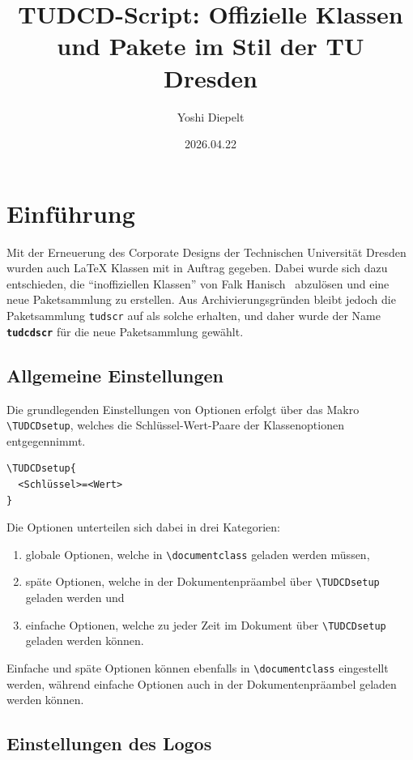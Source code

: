 \documentclass[
  logo={
    color=blue,
    language=de,
    colormodel=rgb
  },
  fontsize=11tudpt,
  usemargin,
  oneside
]{tudcdreprt}
\author{Yoshi Diepelt}
\title{TUDCD-Script: Offizielle Klassen und Pakete im Stil der TU Dresden}
\date{2026.04.22}
\begin{document}
\maketitle%


\tableofcontents


\chapter{Einführung}

Mit der Erneuerung des Corporate Designs der Technischen Universität Dresden wurden auch \LaTeX{} Klassen
mit in Auftrag gegeben.
Dabei wurde sich dazu entschieden, die \enquote{inoffiziellen Klassen} von Falk Hanisch~\cite{ctan-tudscr}
abzulösen und eine neue Paketsammlung zu erstellen.
Aus Archivierungsgründen bleibt jedoch die Paketsammlung \texttt{tudscr} auf \CTAN{} als solche erhalten,
und daher wurde der Name \textbf{\texttt{tudcdscr}} für die neue Paketsammlung gewählt.

\section{Allgemeine Einstellungen}

Die grundlegenden Einstellungen von Optionen erfolgt über das Makro \lstinline|\TUDCDsetup|,
welches die Schlüssel-Wert-Paare der Klassenoptionen entgegennimmt.

\begin{lstlisting}
\TUDCDsetup{
  <Schlüssel>=<Wert>
}
\end{lstlisting}

Die Optionen unterteilen sich dabei in drei Kategorien:
\begin{enumerate}
  \item globale Optionen, welche in \lstinline|\documentclass| geladen werden müssen,
  \item späte Optionen, welche in der Dokumentenpräambel über \lstinline|\TUDCDsetup| geladen werden und
  \item einfache Optionen, welche zu jeder Zeit im Dokument über \lstinline|\TUDCDsetup| geladen werden können.
\end{enumerate}
Einfache und späte Optionen können ebenfalls in \lstinline|\documentclass| eingestellt werden,
während einfache Optionen auch in der Dokumentenpräambel geladen werden können.

\section{Einstellungen des Logos}
\end{document}
